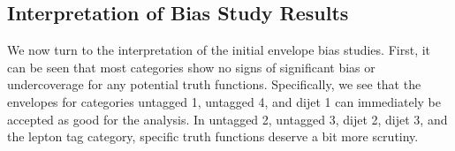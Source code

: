 
\subsection{Interpretation of Bias Study Results}
We now turn to the interpretation of the initial envelope bias studies. First, it can be seen that most 
categories show no signs of significant bias or undercoverage for any potential truth functions. 
Specifically, we see that the envelopes for categories untagged 1, untagged 4, and dijet 1
can immediately be accepted as good for the analysis. In untagged 2, untagged 3, dijet 2, dijet 3, and the lepton 
tag category, specific truth functions deserve a bit more scrutiny. 

